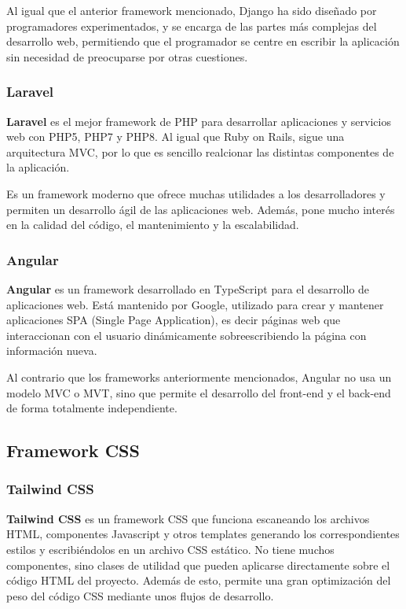     Al igual que el anterior framework mencionado, Django ha sido diseñado por programadores
    experimentados, y se encarga de las partes más complejas del desarrollo web, permitiendo
    que el programador se centre en escribir la aplicación sin necesidad de preocuparse
    por otras cuestiones.

    \subsubsection{Laravel}
    \textbf{Laravel} es el mejor framework de PHP para desarrollar aplicaciones y servicios web con
    PHP5, PHP7 y PHP8. Al igual que Ruby on Rails, sigue una arquitectura MVC, por lo que es
    sencillo realcionar las distintas componentes de la aplicación.

    Es un framework moderno que ofrece muchas utilidades a los desarrolladores y permiten un
    desarrollo ágil de las aplicaciones web. Además, pone mucho interés en la calidad del
    código, el mantenimiento y la escalabilidad.

    \subsubsection{Angular}
    \textbf{Angular} es un framework desarrollado en TypeScript para el desarrollo de
    aplicaciones web. Está mantenido por Google, utilizado para crear y mantener aplicaciones
    SPA (Single Page Application), es decir páginas web que interaccionan con el usuario
    dinámicamente sobreescribiendo la página con información nueva.

    Al contrario que los frameworks anteriormente mencionados, Angular no usa un modelo MVC
    o MVT, sino que permite el desarrollo del front-end y el back-end de forma totalmente
    independiente.

\subsection{Framework CSS}

    \subsubsection{Tailwind CSS}
    \textbf{Tailwind CSS} es un framework CSS que funciona escaneando los archivos HTML,
    componentes Javascript y otros templates generando los correspondientes estilos
    y escribiéndolos en un archivo CSS estático. No tiene muchos componentes, sino clases
    de utilidad que pueden aplicarse directamente sobre el código HTML del proyecto. Además
    de esto, permite una gran optimización del peso del código CSS mediante unos flujos de
    desarrollo.

